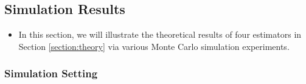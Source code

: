 \documentclass[a4paper]{article}
\begin{document}
\subsection{Simulation Results}

\begin{itemize}
\item In this section, we will illustrate the theoretical results of four estimators in Section \ref{section:theory} via various Monte Carlo simulation experiments.
\end{itemize}

\subsubsection{Simulation Setting}
\end{document}
